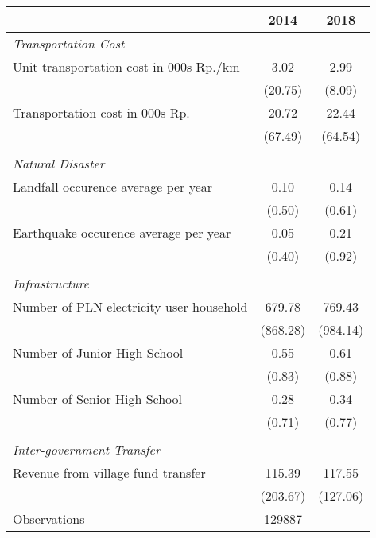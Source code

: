 \begin{tabular}{l*{2}{c}}
\hline\hline
                    &        2014&        2018\\
\hline
\emph{Transportation Cost}&            &            \\
\hspace{0.25cm} Unit transportation cost in 000s Rp./km&        3.02&        2.99\\
                    &     (20.75)&      (8.09)\\
\hspace{0.25cm} Transportation cost in 000s Rp.&       20.72&       22.44\\
                    &     (67.49)&     (64.54)\\
\vspace{0.05em} \\ \emph{Natural Disaster}&            &            \\
\hspace{0.25cm} Landfall occurence average per year&        0.10&        0.14\\
                    &      (0.50)&      (0.61)\\
\hspace{0.25cm} Earthquake occurence average per year&        0.05&        0.21\\
                    &      (0.40)&      (0.92)\\
\vspace{0.05em} \\ \emph{Infrastructure}&            &            \\
\hspace{0.25cm} Number of PLN electricity user household&      679.78&      769.43\\
                    &    (868.28)&    (984.14)\\
\hspace{0.25cm} Number of Junior High School&        0.55&        0.61\\
                    &      (0.83)&      (0.88)\\
\hspace{0.25cm} Number of Senior High School&        0.28&        0.34\\
                    &      (0.71)&      (0.77)\\
\vspace{0.05em} \\ \emph{Inter-government Transfer}&            &            \\
\hspace{0.25cm} Revenue from village fund transfer&      115.39&      117.55\\
                    &    (203.67)&    (127.06)\\
\hline
Observations        &      129887&            \\
\hline\hline
\end{tabular}
